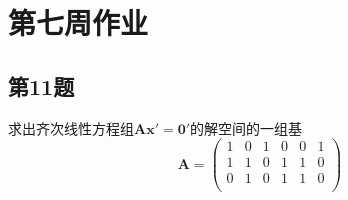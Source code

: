 \newpage
\chapter{第七周作业}

\section{第11题}

求出齐次线性方程组$\bm{A}\bm{x}'=\bm{0}'$的解空间的一组基
\begin{equation}
    \bm{A} = \left(
        \begin{matrix}
            1 &0 &1 &0 &0 &1\\
            1 &1 &0 &1 &1 &0\\
            0 &1 &0 &1 &1 &0\\
        \end{matrix}
    \right)
\end{equation}

